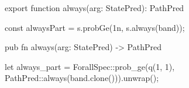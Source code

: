 \begin{tssrc}
export function always(arg: StatePred): PathPred
\end{tssrc}
\begin{tssrc}
const alwaysPart = s.probGe(1n, s.always(band));
\end{tssrc}
\begin{rustsrc}
pub fn always(arg: StatePred) -> PathPred
\end{rustsrc}
\begin{rustsrc}
let always_part = ForallSpec::prob_ge(q(1, 1), PathPred::always(band.clone())).unwrap();
\end{rustsrc}
